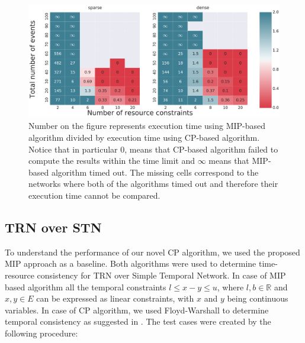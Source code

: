 \begin{figure}
\begin{center}
\includegraphics[width=\textwidth]{when_better}
\caption{Number on the figure represents execution time using MIP-based algorithm divided by execution time using CP-based algorithm. Notice that in particular $0$, means that CP-based algorithm failed to compute the results within the time limit and $\infty$ means that MIP-based algorithm timed out. The missing cells correspond to the networks where both of the algorithms timed out and therefore their execution time cannot be compared.   }
\label{fig:when_better}
\end{center}
\end{figure}

\subsection{TRN over STN}
To understand the performance of our novel CP algorithm, we used the proposed MIP approach as a baseline. Both algorithms were used to determine time-resource consistency for TRN over Simple Temporal Network. In case of MIP based algorithm all the temporal constraints $l \leq x - y \leq u$, where $l,b \in \mathbb{R}$ and $x,y \in E$ can be expressed as linear constraints, with $x$ and $y$ being continuous variables. In case of CP algorithm, we used Floyd-Warshall to determine temporal consistency as suggested in \cite{dechter1991temporal}. The test cases were created by the following procedure:


